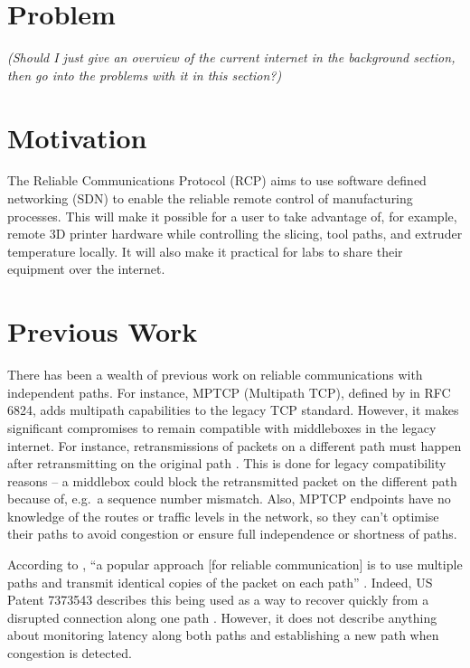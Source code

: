 \documentclass[letterpaper]{../kuthesis/kuthesis}
\begin{document}
\section{Problem}
\emph{(Should I just give an overview of the current internet in the background
section, then go into the problems with it in this section?)}

\section{Motivation}
The Reliable Communications Protocol (RCP) aims to use software defined 
networking (SDN) to enable the reliable remote control of manufacturing 
processes. This will make it possible for a user to take advantage of, 
for example, remote 3D printer hardware while controlling the slicing, 
tool paths, and extruder temperature locally. It will also make it practical 
for labs to share their equipment over the internet.

\section{Previous Work}
There has been a wealth of previous work on reliable communications with
independent paths. For instance, MPTCP (Multipath TCP), defined
by \citeauthor{rfc6824} in RFC 6824, 
adds multipath 
capabilities to the legacy TCP standard. However, it makes significant 
compromises to remain compatible with middleboxes in the legacy internet. 
For instance, retransmissions of packets on a different path must happen 
after retransmitting on the original path \cite{rfc6824}. This is done 
for legacy compatibility reasons -- a middlebox 
could block the retransmitted packet on the different path because of, e.g.\ 
a sequence number mismatch.
Also, MPTCP endpoints have no knowledge of the routes or traffic levels in 
the network, so they can't optimise their paths to avoid congestion or ensure 
full independence or shortness of paths. 

According to \citeauthor{oh09}, ``a popular approach [for reliable 
communication] is to use  multiple paths and transmit identical copies 
of the packet on each path'' \citeyear{oh09}. Indeed, US Patent 7373543
describes this being used as a way to recover quickly from a disrupted 
connection along one path \cite{us7373543}. However, it does not describe anything 
about monitoring latency along both paths and establishing a new path when 
congestion is detected.
\end{document}
